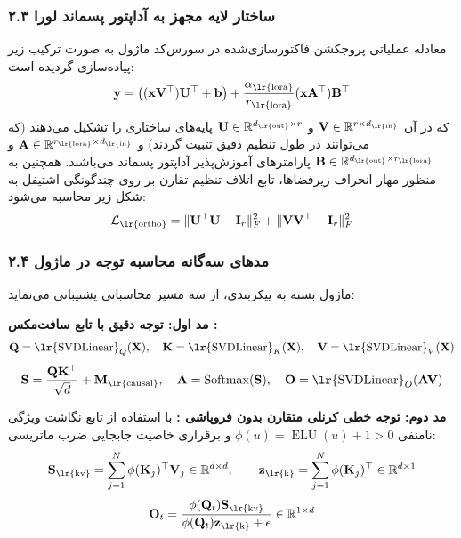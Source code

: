 \subsubsection*{۲.۳ ساختار لایه  مجهز به آداپتور پسماند لورا }
معادله عملیاتی پروجکشن فاکتورسازی‌شده در سورس‌کد ماژول به صورت ترکیب زیر پیاده‌سازی گردیده است:
\begin{equation}
\mathbf{y} = \left( (\mathbf{x} \mathbf{V}^\top) \mathbf{U}^\top + \mathbf{b} \right) + \frac{\alpha_{\text{\lr{lora}}}}{r_{\text{\lr{lora}}}} (\mathbf{x} \mathbf{A}^\top) \mathbf{B}^\top
\end{equation}
که در آن $\mathbf{V} \in \mathbb{R}^{r \times d_{\text{\lr{in}}}}$ و $\mathbf{U} \in \mathbb{R}^{d_{\text{\lr{out}}} \times r}$ پایه‌های ساختاری  را تشکیل می‌دهند (که می‌توانند در طول تنظیم دقیق تثبیت  گردند) و $\mathbf{A} \in \mathbb{R}^{r_{\text{\lr{lora}}} \times d_{\text{\lr{in}}}}$ و $\mathbf{B} \in \mathbb{R}^{d_{\text{\lr{out}}} \times r_{\text{\lr{lora}}}}$ پارامترهای آموزش‌پذیر آداپتور پسماند می‌باشند. همچنین به منظور مهار انحراف زیرفضاها، تابع اتلاف تنظیم تقارن بر روی چندگونگی اشتیفل  به شکل زیر محاسبه می‌شود:
\begin{equation}
\mathcal{L}_{\text{\lr{ortho}}} = \|\mathbf{U}^\top \mathbf{U} - \mathbf{I}_r\|_F^2 + \|\mathbf{V} \mathbf{V}^\top - \mathbf{I}_r\|_F^2
\end{equation}

\subsubsection*{۲.۴ مدهای سه‌گانه محاسبه توجه در ماژول}
ماژول  بسته به پیکربندی، از سه مسیر محاسباتی پشتیبانی می‌نماید:

\textbf{مد اول: توجه دقیق با تابع سافت‌مکس :}
\begin{equation}
\mathbf{Q} = \text{\lr{SVDLinear}}_Q(\mathbf{X}), \quad \mathbf{K} = \text{\lr{SVDLinear}}_K(\mathbf{X}), \quad \mathbf{V} = \text{\lr{SVDLinear}}_V(\mathbf{X})
\end{equation}
\begin{equation}
\mathbf{S} = \frac{\mathbf{Q} \mathbf{K}^\top}{\sqrt{d}} + \mathbf{M}_{\text{\lr{causal}}}, \quad \mathbf{A} = \operatorname{Softmax}(\mathbf{S}), \quad \mathbf{O} = \text{\lr{SVDLinear}}_O(\mathbf{A} \mathbf{V})
\end{equation}

\textbf{مد دوم: توجه خطی کرنلی متقارن بدون فروپاشی :}
با استفاده از تابع نگاشت ویژگی نامنفی $\phi(u) = \operatorname{ELU}(u) + 1 > 0$ و برقراری خاصیت جابجایی ضرب ماتریسی:
\begin{equation}
\mathbf{S}_{\text{\lr{kv}}} = \sum_{j=1}^N \phi(\mathbf{K}_j)^\top \mathbf{V}_j \in \mathbb{R}^{d \times d}, \qquad \mathbf{z}_{\text{\lr{k}}} = \sum_{j=1}^N \phi(\mathbf{K}_j)^\top \in \mathbb{R}^{d \times 1}
\end{equation}
\begin{equation}
\mathbf{O}_t = \frac{\phi(\mathbf{Q}_t) \mathbf{S}_{\text{\lr{kv}}}}{\phi(\mathbf{Q}_t) \mathbf{z}_{\text{\lr{k}}} + \epsilon} \in \mathbb{R}^{1 \times d}
\end{equation}

